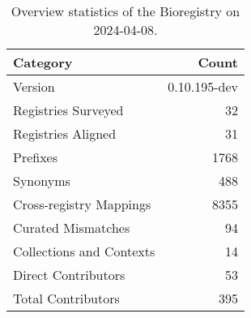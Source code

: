 \begin{table}
\caption{Overview statistics of the Bioregistry on 2024-04-08.}
\label{tab:bioregistry-summary}
\begin{tabular}{lr}
\toprule
Category & Count \\
\midrule
Version & 0.10.195-dev \\
Registries Surveyed & 32 \\
Registries Aligned & 31 \\
Prefixes & 1768 \\
Synonyms & 488 \\
Cross-registry Mappings & 8355 \\
Curated Mismatches & 94 \\
Collections and Contexts & 14 \\
Direct Contributors & 53 \\
Total Contributors & 395 \\
\bottomrule
\end{tabular}
\end{table}
